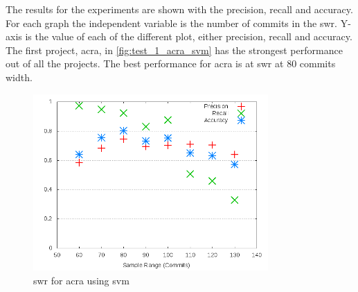 The results for the experiments are shown with the precision, recall and accuracy. For each graph the independent variable is the number of commits in the \gls{swr}. Y-axis is the value of each of the different plot, either precision, recall and accuracy. The first project, acra, in \autoref{fig:test_1_acra_svm} has the strongest performance out of all the projects. The best performance for acra is at \gls{swr} at 80 commits width.



\begin{figure}[!h]
    \centering

        \includegraphics[width=0.8\textwidth]{images/svm/test_1/acra_sample_range}
        \caption{\gls{swr} for acra using \gls{svm}}
        \label{fig:test_1_acra_svm}
\end{figure}

